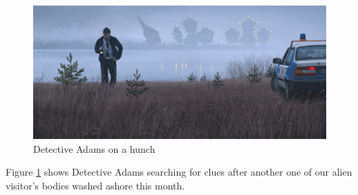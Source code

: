 \documentclass{article}
\begin{document}
\begin{figure}[b!]
  \includegraphics[width=\linewidth]{thehunch_1920.jpg}
  \caption{Detective Adams on a hunch}
  \label{fig:hunch}
\end{figure}

Figure \ref{fig:hunch} shows Detective Adams searching for clues after another one of our alien visitor's bodies washed ashore this month.
\end{document}
